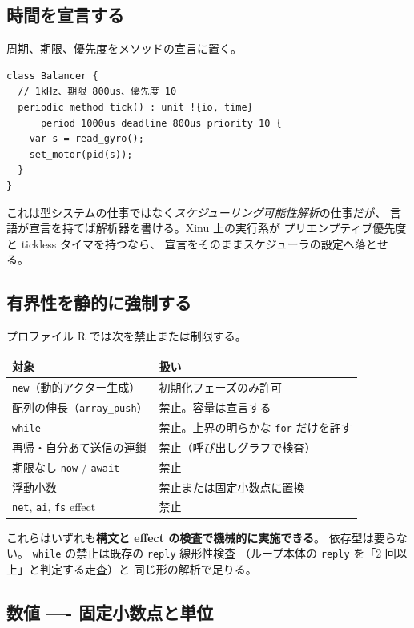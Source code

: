 \documentclass[11pt,a4paper]{ltjsarticle}
\theoremstyle{remark}
\begin{document}
\subsection{時間を宣言する}

周期、期限、優先度をメソッドの宣言に置く。

\begin{lstlisting}[language=AIPL]
class Balancer {
  // 1kHz、期限 800us、優先度 10
  periodic method tick() : unit !{io, time}
      period 1000us deadline 800us priority 10 {
    var s = read_gyro();
    set_motor(pid(s));
  }
}
\end{lstlisting}

これは型システムの仕事ではなく\emph{スケジューリング可能性解析}の仕事だが、
言語が宣言を持てば解析器を書ける。Xinu 上の実行系が
プリエンプティブ優先度と tickless タイマを持つなら、
宣言をそのままスケジューラの設定へ落とせる。

\subsection{有界性を静的に強制する}

プロファイル R では次を禁止または制限する。

\begin{center}
\small
\begin{tabular}{@{}ll@{}}
\toprule
対象 & 扱い \\
\midrule
\texttt{new}（動的アクター生成） & 初期化フェーズのみ許可 \\
配列の伸長（\texttt{array\_push}） & 禁止。容量は宣言する \\
\texttt{while} & 禁止。上界の明らかな \texttt{for} だけを許す \\
再帰・自分あて送信の連鎖 & 禁止（呼び出しグラフで検査） \\
期限なし \texttt{now} / \texttt{await} & 禁止 \\
浮動小数 & 禁止または固定小数点に置換 \\
\texttt{net}, \texttt{ai}, \texttt{fs} effect & 禁止 \\
\bottomrule
\end{tabular}
\end{center}

これらはいずれも\textbf{構文と effect の検査で機械的に実施できる}。
依存型は要らない。
\texttt{while} の禁止は既存の \texttt{reply} 線形性検査
（ループ本体の \texttt{reply} を「2 回以上」と判定する走査）と
同じ形の解析で足りる。

\subsection{数値 ---- 固定小数点と単位}
\end{document}
